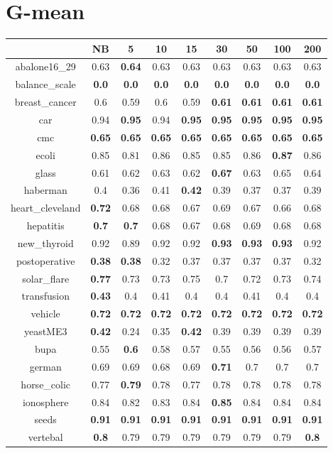 \documentclass{article}%
\begin{document}
%
\section*{G{-}mean}%
\begin{tabular}{c|cccccccc}%
\hline%
&NB&5&10&15&30&50&100&200\\%
\hline%
abalone16\_29&0.63&\textbf{0.64}&0.63&0.63&0.63&0.63&0.63&0.63\\%
\hline%
balance\_scale&\textbf{0.0}&\textbf{0.0}&\textbf{0.0}&\textbf{0.0}&\textbf{0.0}&\textbf{0.0}&\textbf{0.0}&\textbf{0.0}\\%
\hline%
breast\_cancer&0.6&0.59&0.6&0.59&\textbf{0.61}&\textbf{0.61}&\textbf{0.61}&\textbf{0.61}\\%
\hline%
car&0.94&\textbf{0.95}&0.94&\textbf{0.95}&\textbf{0.95}&\textbf{0.95}&\textbf{0.95}&\textbf{0.95}\\%
\hline%
cmc&\textbf{0.65}&\textbf{0.65}&\textbf{0.65}&\textbf{0.65}&\textbf{0.65}&\textbf{0.65}&\textbf{0.65}&\textbf{0.65}\\%
\hline%
ecoli&0.85&0.81&0.86&0.85&0.85&0.86&\textbf{0.87}&0.86\\%
\hline%
glass&0.61&0.62&0.63&0.62&\textbf{0.67}&0.63&0.65&0.64\\%
\hline%
haberman&0.4&0.36&0.41&\textbf{0.42}&0.39&0.37&0.37&0.39\\%
\hline%
heart\_cleveland&\textbf{0.72}&0.68&0.68&0.67&0.69&0.67&0.66&0.68\\%
\hline%
hepatitis&\textbf{0.7}&\textbf{0.7}&0.68&0.67&0.68&0.69&0.68&0.68\\%
\hline%
new\_thyroid&0.92&0.89&0.92&0.92&\textbf{0.93}&\textbf{0.93}&\textbf{0.93}&0.92\\%
\hline%
postoperative&\textbf{0.38}&\textbf{0.38}&0.32&0.37&0.37&0.37&0.37&0.32\\%
\hline%
solar\_flare&\textbf{0.77}&0.73&0.73&0.75&0.7&0.72&0.73&0.74\\%
\hline%
transfusion&\textbf{0.43}&0.4&0.41&0.4&0.4&0.41&0.4&0.4\\%
\hline%
vehicle&\textbf{0.72}&\textbf{0.72}&\textbf{0.72}&\textbf{0.72}&\textbf{0.72}&\textbf{0.72}&\textbf{0.72}&\textbf{0.72}\\%
\hline%
yeastME3&\textbf{0.42}&0.24&0.35&\textbf{0.42}&0.39&0.39&0.39&0.39\\%
\hline%
bupa&0.55&\textbf{0.6}&0.58&0.57&0.55&0.56&0.56&0.57\\%
\hline%
german&0.69&0.69&0.68&0.69&\textbf{0.71}&0.7&0.7&0.7\\%
\hline%
horse\_colic&0.77&\textbf{0.79}&0.78&0.77&0.78&0.78&0.78&0.78\\%
\hline%
ionosphere&0.84&0.82&0.83&0.84&\textbf{0.85}&0.84&0.84&0.84\\%
\hline%
seeds&\textbf{0.91}&\textbf{0.91}&\textbf{0.91}&\textbf{0.91}&\textbf{0.91}&\textbf{0.91}&\textbf{0.91}&\textbf{0.91}\\%
\hline%
vertebal&\textbf{0.8}&0.79&0.79&0.79&0.79&0.79&0.79&\textbf{0.8}\\%
\hline%
\end{tabular}

%
\end{document}
